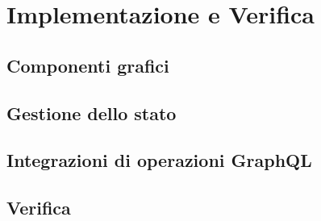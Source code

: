\chapter{Implementazione e Verifica}

\section{Componenti grafici}

\section{Gestione dello stato}

\section{Integrazioni di operazioni GraphQL}

\section{Verifica}